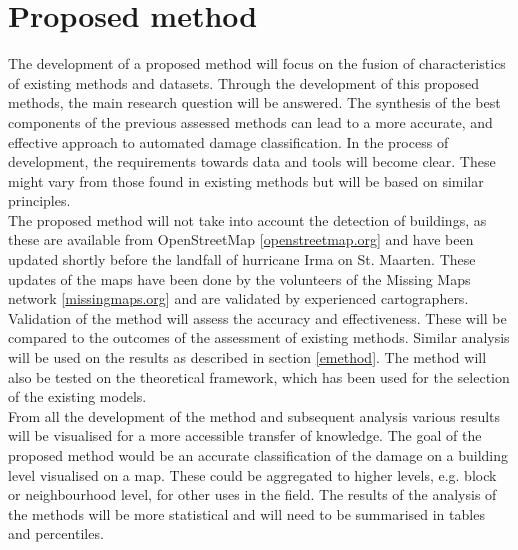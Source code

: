 \section {Proposed method}
The development of a proposed method will focus on the fusion of characteristics of existing methods and datasets. Through the development of this proposed methods, the main research question will be answered. The synthesis of the best components of the previous assessed methods can lead to a more accurate, and effective approach to automated damage classification. In the process of development, the requirements towards data and tools will become clear. These might vary from those found in existing methods but will be based on similar principles.\\
The proposed method will not take into account the detection of buildings, as these are available from OpenStreetMap [\href{https://www.openstreetmap.org}{openstreetmap.org}] and have been updated shortly before the landfall of hurricane Irma on St. Maarten. These updates of the maps have been done by the volunteers of the Missing Maps network [\href{https://www.missingmaps.org}{missingmaps.org}] and are validated by experienced cartographers. \\
Validation of the method will assess the accuracy and effectiveness. These will be compared to the outcomes of the assessment of existing methods. Similar analysis will be used on the results as described in section \ref{emethod}. The method will also be tested on the theoretical framework, which has been used for the selection of the existing models.\\
From all the development of the method and subsequent analysis various results will be visualised for a more accessible transfer of knowledge. The goal of the proposed method would be an accurate classification of the damage on a building level visualised on a map. These could be aggregated to higher levels, e.g. block or neighbourhood level, for other uses in the field. The results of the analysis of the methods will be more statistical and will need to be summarised in tables and percentiles.\\

